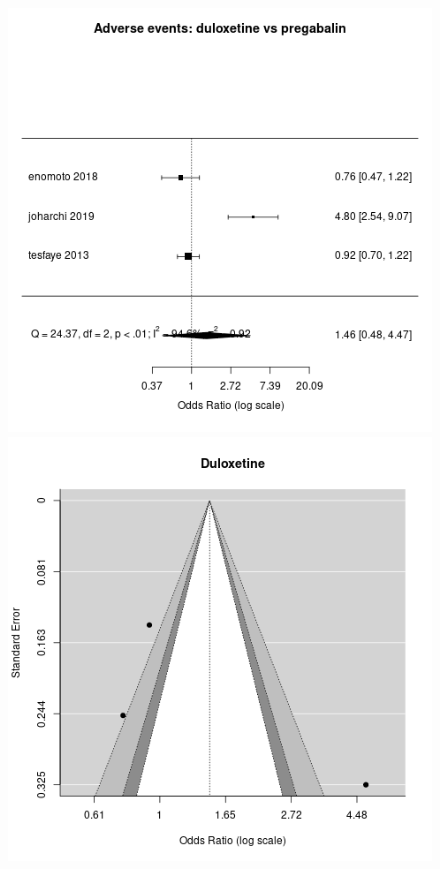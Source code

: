 \documentclass{report}\usepackage[]{graphicx}\usepackage[]{color}
\newenvironment{knitrout}{}{} %
\begin{document}
\begin{figure}
\begin{knitrout}
\color{fgcolor}
\includegraphics[width=0.5\linewidth,height=0.35\textheight]{img/adverse-duloxetine-pregabalin-forest} 
\includegraphics[width=0.5\linewidth,height=0.35\textheight]{img/adverse-duloxetine-pregabalin-funnel} 
\end{knitrout}

\caption[Adverse: duloxetine vs pregabalin]{}
\label{fig:adverse-dulox-pregab}
\end{figure}
\end{document}
